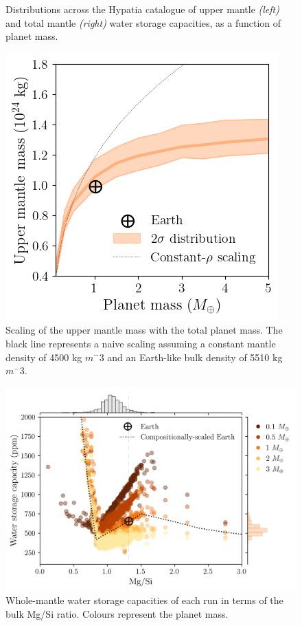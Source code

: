 \documentclass[linenumbers]{aastex631}
\begin{document}
\begin{figure}
\begin{subfigure}[b]{.5\textwidth}
  \caption{}
  \label{fig:violin_total}
\end{subfigure}
\caption{Distributions across the Hypatia catalogue of upper mantle \textit{(left)} and total mantle \textit{(right)} water storage capacities, as a function of planet mass.}
\label{fig:violin_masses}
\end{figure}


\begin{figure}
    \centering
    \includegraphics{pops_dist_M_p_mass_um.png}
    \caption{Scaling of the upper mantle mass with the total planet mass. The black line represents a naive scaling assuming a constant mantle density of 4500 kg $m^-3$ and an Earth-like bulk density of 5510 kg $m^-3$.}
    \label{fig:mass_um}
\end{figure}

\begin{figure}
    \centering
    \includegraphics{mgsi_c_h2o_mantle_scatter_all.png}
    \caption{Whole-mantle water storage capacities of each run in terms of the bulk Mg/Si ratio. Colours represent the planet mass.}
    \label{fig:h2o_mgsi_scatter}
\end{figure}
\end{document}
